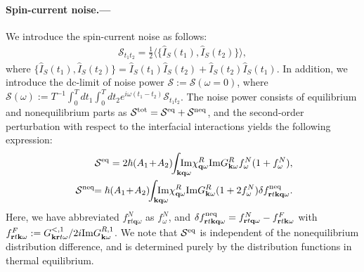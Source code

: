 \documentclass[aps,prl,reprint,showpacs]{revtex4-1}
\def\v#1{\mathbf{#1}}
\def\r{\v{r}} 					%
\def\q{\v{q}} 					%
\def\k{\v{k}} 					%
\def\la{\langle}
\def\ra{\rangle}
\def\IM{{\rm Im}} %
\begin{document}
\paragraph{Spin-current noise.---}
We introduce the spin-current noise as follows:
\begin{eqnarray}
\mathcal{S}_{t_1 t_2} = \frac12 \la  \{ \hat{I}_{S}(t_1), \hat{I}_{S}(t_2) \} \ra,
\end{eqnarray}
where $\{ \hat{I}_{S}(t_1), \hat{I}_{S}(t_2) \} = \hat{I}_{S}(t_1) \hat{I}_{S}(t_2)+\hat{I}_{S}(t_2) \hat{I}_{S}(t_1)$. In addition, we introduce the dc-limit of noise power $\mathcal{S}:=\mathcal{S}(\omega=0)$, where $\mathcal{S}(\omega) := T^{-1}\int_0^T dt_1 \int_0^T dt_2 e^{i\omega (t_1-t_2)} \mathcal{S}_{t_1 t_2}$. 
The noise power consists of equilibrium and nonequilibrium parts as $\mathcal{S}^{\rm tot} = \mathcal{S}^{\rm eq} +\mathcal{S}^{\rm neq}$, and the second-order perturbation with respect to the interfacial interactions yields the following expression:
\begin{eqnarray}
&&\!\!\!\! \mathcal{S}^{\rm eq}=2\hbar ( A_1\! +\! A_2) \!\!\int_{\k\q\omega} \!\!\!\!\!\!\!\! \IM \chi^{R}_{\q\omega} \IM G^{R}_{\k\omega}f^N_\omega(1+f^N_\omega), \label{eq:Seq}\\
&&\!\!\!\! \mathcal{S}^{\rm neq}\!\!=\hbar ( A_1\! +\! A_2) \!\!\int_{\k\q\omega} \!\!\!\!\!\!\!\! \IM \chi^{R}_{\q\omega} \IM G^{R}_{\k\omega}  (1+2f^N_\omega) \delta f^{{\rm neq}}_{\r t\k\q\omega}. \label{eq:Sneq}
\end{eqnarray}
Here, we have abbreviated $f^N_{\r t\q\omega}$ as $ f^N_\omega$, and
$\delta f^{{\rm neq}}_{\r t\k\q\omega} = f^N_{\r t\q\omega} - f^{F}_{\r t\k\omega}$
with $f^{F}_{\r t\k\omega} := G^{<,1}_{\k\r t\omega}/2i \IM G^{R,1}_{\k\omega}$.
We note that $\mathcal{S}^{\rm eq}$ is independent of the nonequilibrium distribution difference, and is determined purely by the distribution functions in thermal equilibrium.
\end{document}
